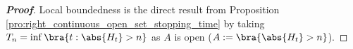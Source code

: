 \begin{proof}[\bf Proof]
Local boundedness is the direct result from Proposition \ref{pro:right_continuous_open_set_stopping_time} by taking $T_n = \inf\bra{t:\abs{H_t} > n}$ as $A$ is open ($A := \bra{\abs{H_t} > n}$).
\end{proof}









